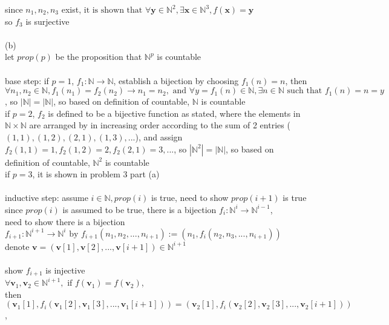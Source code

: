 \documentclass[12pt, border = 4pt, multi]{article} %
\begin{document}
since $n_1, n_2, n_3$ exist, $\text{it is shown that }\forall \textbf{y} \in \mathbb{N} ^ 2, \exists \textbf{x} \in \mathbb{N} ^ 3, f(\textbf{x}) = \textbf{y}$\\
so $f_3$ is surjective\\
\\
(b)\\
let $prop(p)$ be the proposition that $\mathbb{N} ^ p$ is countable\\
\\
base step: if $p = 1$, $f_1: \mathbb{N} \rightarrow \mathbb{N}$, establish a bijection by choosing $f_1(n) = n$, then $\forall n_1, n_2 \in \mathbb{N}, f_1(n_1) = f_2(n_2) \rightarrow n_1 = n_2, \text{ and }\forall y = f_1(n) \in \mathbb{N}, \exists n \in \mathbb{N} \text{ such that } f_1(n) = n = y$, so $|\mathbb{N}| = |\mathbb{N}|$, so based on definition of countable, $\mathbb{N}$ is countable\\
if $p = 2$, $f_2$ is defined to be a bijective function as stated, where the elements in $\mathbb{N} \times \mathbb{N}$ are arranged by in increasing order according to the sum of 2 entries ($(1, 1), (1, 2), (2, 1), (1, 3), ...$), and assign $f_2(1, 1) = 1, f_2(1, 2) = 2, f_2(2, 1) = 3, ...$, so $|\mathbb{N} ^ 2| = |\mathbb{N}|$, so based on definition of countable, $\mathbb{N} ^ 2$ is countable\\
if $p = 3$, it is shown in problem 3 part (a)\\
\\
inductive step: assume $i \in \mathbb{N}, prop(i)$ is true, need to show $prop(i + 1)$ is true\\
since $prop(i)$ is assumed to be true, there is a bijection $f_i: \mathbb{N} ^ i \rightarrow \mathbb{N} ^ {i - 1}$,\\
need to show there is a bijection $f_{i + 1}: \mathbb{N} ^ {i + 1} \rightarrow \mathbb{N} ^ i \text{ by } f_{i + 1}(n_1, n_2, ..., n_{i + 1}) := (n_1, f_i(n_2, n_3, ..., n_{i + 1}))$\\
denote $\textbf{v} = (\textbf{v}[1], \textbf{v}[2], ..., \textbf{v}[i + 1]) \in \mathbb{N} ^ {i + 1}$\\
\\
show $f_{i + 1}$ is injective\\
$\forall \textbf{v}_1, \textbf{v}_2 \in \mathbb{N} ^ {i + 1}, \text{ if } f(\textbf{v}_1) = f(\textbf{v}_2)$,\\
then $(\textbf{v}_1[1], f_i(\textbf{v}_1[2], \textbf{v}_1[3], ..., \textbf{v}_1[i + 1])) = (\textbf{v}_2[1], f_i(\textbf{v}_2[2], \textbf{v}_2[3], ..., \textbf{v}_2[i + 1]))$,\\
\end{document}
